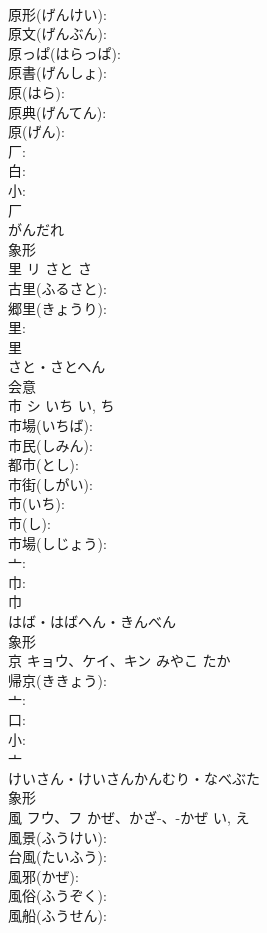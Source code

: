 \documentclass[8pt]{extreport}
\begin{document}
\begin{CJK}{UTF8}{min}
\\	原形(げんけい): 
\\	原文(げんぶん): 
\\	原っぱ(はらっぱ): 
\\	原書(げんしょ): 
\\	原(はら): 
\\	原典(げんてん): 
\\	原(げん): 
\\	厂: 
\\	白: 
\\	小: 
\\	厂	
\\	がんだれ	
\\	象形 
\\	里	リ	さと	さ	
\\	古里(ふるさと): 
\\	郷里(きょうり): 
\\	里: 
\\	里	
\\	さと・さとへん	
\\	会意 
\\	市	シ	いち	い, ち	
\\	市場(いちば): 
\\	市民(しみん): 
\\	都市(とし): 
\\	市街(しがい): 
\\	市(いち): 
\\	市(し): 
\\	市場(しじょう): 
\\	亠: 
\\	巾: 
\\	巾	
\\	はば・はばへん・きんべん	
\\	象形 
\\	京	キョウ、ケイ、キン	みやこ	たか	
\\	帰京(ききょう): 
\\	亠: 
\\	口: 
\\	小: 
\\	亠	
\\	けいさん・けいさんかんむり・なべぶた	
\\	象形 
\\	風	フウ、フ	かぜ、かざ-、-かぜ	い, え	
\\	風景(ふうけい): 
\\	台風(たいふう): 
\\	風邪(かぜ): 
\\	風俗(ふうぞく): 
\\	風船(ふうせん): 

\end{CJK}
\end{document}
